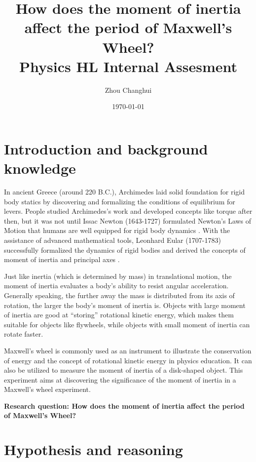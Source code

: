 \documentclass[a4paper]{article}
\begin{document}
\begin{titlepage}
    \title{\textbf{How does the moment of inertia affect the period of Maxwell's Wheel? \\ \small Physics HL Internal Assesment}}
    \author{Zhou Changhui}
    \date{\today}
    \maketitle
\end{titlepage}

\section{Introduction and background knowledge}

In ancient Greece (around 220 B.C.), Archimedes laid solid foundation for rigid body statics by discovering and formalizing the conditions of equilibrium for levers. People studied Archimedes's work and developed concepts like torque after then, but it was not until Issac Newton (1643-1727) formulated Newton's Laws of Motion that humans are well equipped for rigid body dynamics \cite{farber-1961}. With the assistance of advanced mathematical tools, Leonhard Eular (1707-1783) successfully formalized the dynamics of rigid bodies and derived the concepts of moment of inertia and principal axes \cite{marquina2016leonhard}.

Just like inertia (which is determined by mass) in translational motion, the moment of inertia evaluates a body's ability to resist angular acceleration. Generally speaking, the further away the mass is distributed from its axis of rotation, the larger the body's moment of inertia is. Objects with large moment of inertia are good at ``storing'' rotational kinetic energy, which makes them suitable for objects like flywheels, while objects with small moment of inertia can rotate faster. 

Maxwell's wheel is commonly used as an instrument to illustrate the conservation of energy and the concept of rotational kinetic energy in physics education. It can also be utilized to measure the moment of inertia of a disk-shaped object. This experiment aims at discovering the significance of the moment of inertia in a Maxwell's wheel experiment.

\textbf{Research question: How does the moment of inertia affect the period of Maxwell's Wheel?}

\section{Hypothesis and reasoning}
\end{document}
